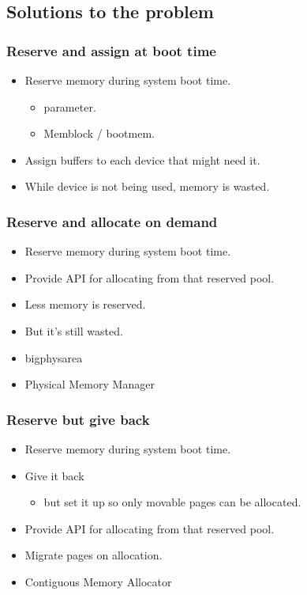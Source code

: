 
\subsection{Solutions to the problem}

\begin{frame}
  \frametitle{Reserve and assign at boot time}

  \begin{itemize}
  \item Reserve memory during system boot time.
    \begin{itemize}
    \item {} parameter.
    \item Memblock / bootmem.
    \end{itemize}
  \item Assign buffers to each device that might need it.
  \item While device is not being used, memory is wasted.
  \end{itemize}
\end{frame}

\begin{frame}
  \frametitle{Reserve and allocate on demand}

  \begin{itemize}
  \item Reserve memory during system boot time.
  \item Provide API for allocating from that reserved pool.
  \item Less memory is reserved.
  \item But it's still wasted.
  \end{itemize}

  \begin{itemize}
  \item bigphysarea
  \item Physical Memory Manager
  \end{itemize}
\end{frame}

\begin{frame}
  \frametitle{Reserve but give back}

  \begin{itemize}
  \item Reserve memory during system boot time.
  \item Give it back
    \begin{itemize}
    \item but set it up so only movable pages can be allocated.
    \end{itemize}
  \item Provide API for allocating from that reserved pool.
  \item Migrate pages on allocation.
  \end{itemize}

  \begin{itemize}
  \item Contiguous Memory Allocator
  \end{itemize}
\end{frame}
